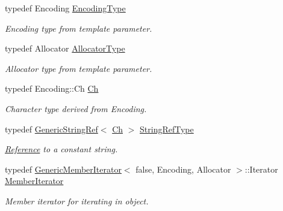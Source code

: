 \begin{DoxyCompactItemize}
\mbox{\label{classGenericValue_a28c2cb8d04d12566c1af37597a46d209}} 
typedef Encoding \hyperlink{classGenericValue_a28c2cb8d04d12566c1af37597a46d209}{Encoding\+Type}
\begin{DoxyCompactList}\small\item\em Encoding type from template parameter. \end{DoxyCompactList}\item 
\mbox{\label{classGenericValue_a7beb83860c1b8d2a0e2a7da9796b2fa1}} 
typedef Allocator \hyperlink{classGenericValue_a7beb83860c1b8d2a0e2a7da9796b2fa1}{Allocator\+Type}
\begin{DoxyCompactList}\small\item\em Allocator type from template parameter. \end{DoxyCompactList}\item 
\mbox{\label{classGenericValue_ade0e0ce64ccd5d852da57a35e720bafb}} 
typedef Encoding\+::\+Ch \hyperlink{classGenericValue_ade0e0ce64ccd5d852da57a35e720bafb}{Ch}
\begin{DoxyCompactList}\small\item\em Character type derived from Encoding. \end{DoxyCompactList}\item 
\mbox{\label{classGenericValue_a32e0f30ee278072374c8168b14d3317f}} 
typedef \hyperlink{structGenericStringRef}{Generic\+String\+Ref}$<$ \hyperlink{classGenericValue_ade0e0ce64ccd5d852da57a35e720bafb}{Ch} $>$ \hyperlink{classGenericValue_a32e0f30ee278072374c8168b14d3317f}{String\+Ref\+Type}
\begin{DoxyCompactList}\small\item\em \hyperlink{structReference}{Reference} to a constant string. \end{DoxyCompactList}\item 
\mbox{\label{classGenericValue_a349b8faae61edc42b4289726820be439}} 
typedef \hyperlink{classGenericMemberIterator}{Generic\+Member\+Iterator}$<$ false, Encoding, Allocator $>$\+::Iterator \hyperlink{classGenericValue_a349b8faae61edc42b4289726820be439}{Member\+Iterator}
\begin{DoxyCompactList}\small\item\em Member iterator for iterating in object. \end{DoxyCompactList}\item 

\end{DoxyCompactItemize}
